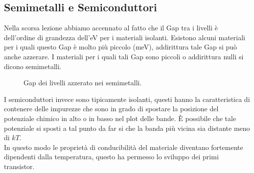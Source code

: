 \subsection{Semimetalli e Semiconduttori}
\label{subsec:Semiconduttori}
Nella scorsa lezione abbiamo accennato al fatto che il Gap tra i livelli è dell'ordine di grandezza dell'eV per i materiali isolanti. Esistono alcuni materiali per i quali questo Gap è molto più piccolo (meV), addirittura tale Gap si può anche azzerare. I materiali per i quali tali Gap sono piccoli o addirittura nulli si dicono semimetalli. 
\begin{figure}[H]
    \centering
    \caption{Gap dei livelli azzerato nei semimetalli.}
    \label{fig:gap-azzerato}
\end{figure}
\noindent
I semiconduttori invece sono tipicamente isolanti, questi hanno la caratteristica di contenere delle impurezze che sono in grado di spostare la posizione del potenziale chimico in alto o in basso nel plot delle bande. È possibile che tale potenziale si sposti a tal punto da far si che la banda più vicina sia distante meno di $kT$. \\
In questo modo le proprietà di conducibilità del materiale diventano fortemente dipendenti dalla temperatura, questo ha permesso lo sviluppo dei primi transistor.
